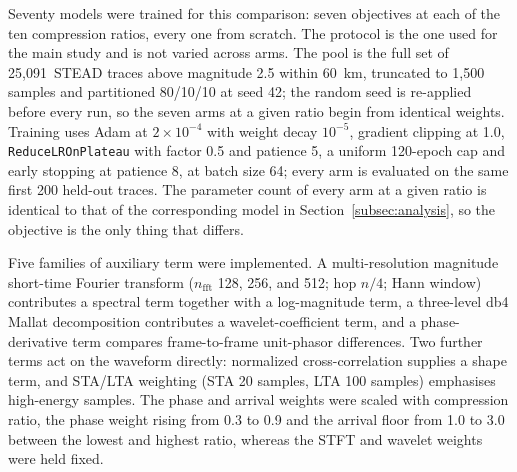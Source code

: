 \documentclass[fleqn,10pt]{wlscirep}
\begin{document}
Seventy models were trained for this comparison: seven objectives at each of the ten compression ratios, every one from scratch. The protocol is the one used for the main study and is not varied across arms. The pool is the full set of 25,091~STEAD traces above magnitude 2.5 within 60~km, truncated to 1{,}500 samples and partitioned 80/10/10 at seed 42; the random seed is re-applied before every run, so the seven arms at a given ratio begin from identical weights. Training uses Adam at $2\times10^{-4}$ with weight decay $10^{-5}$, gradient clipping at 1.0, \texttt{ReduceLROnPlateau} with factor 0.5 and patience 5, a uniform 120-epoch cap and early stopping at patience 8, at batch size 64; every arm is evaluated on the same first 200 held-out traces. The parameter count of every arm at a given ratio is identical to that of the corresponding model in Section~\ref{subsec:analysis}, so the objective is the only thing that differs.

Five families of auxiliary term were implemented. A multi-resolution magnitude short-time Fourier transform ($n_{\mathrm{fft}}$ 128, 256, and 512; hop $n/4$; Hann window) contributes a spectral term together with a log-magnitude term, a three-level db4 Mallat decomposition contributes a wavelet-coefficient term, and a phase-derivative term compares frame-to-frame unit-phasor differences. Two further terms act on the waveform directly: normalized cross-correlation supplies a shape term, and STA/LTA weighting (STA 20 samples, LTA 100 samples) emphasises high-energy samples. The phase and arrival weights were scaled with compression ratio, the phase weight rising from 0.3 to 0.9 and the arrival floor from 1.0 to 3.0 between the lowest and highest ratio, whereas the STFT and wavelet weights were held fixed.
\end{document}

